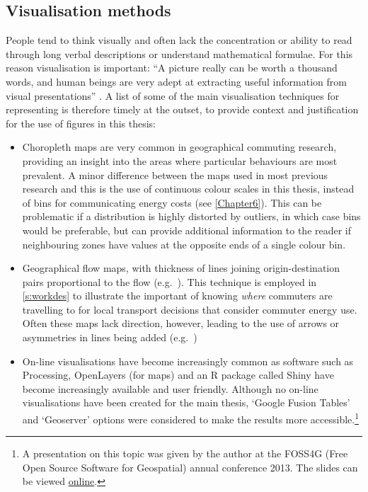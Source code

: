 \subsection{Visualisation methods}
People tend to think visually and often lack the concentration or ability
to read through long verbal descriptions or understand mathematical formulae.
For this reason visualisation is important:
``A picture really can be worth a thousand words, and human beings are very adept
at extracting useful information from visual presentations'' \citep[p.~4]{kabacoff2011r}.
A list of some of the main visualisation techniques for representing
is therefore timely at the outset, to provide context and justification
for the use of figures in this thesis:
\begin{itemize}
 \item Choropleth maps are very common in geographical commuting research,
 providing an insight into the areas where particular behaviours are most
 prevalent. A minor difference between the maps used in most previous
 research and this is the use of continuous colour scales in this thesis,
 instead of bins for communicating energy costs (see \cref{Chapter6}).
 This can be problematic if a distribution is highly
 distorted by outliers, in which case bins would be preferable, but can provide
 additional information to the reader if neighbouring zones have values at the
 opposite ends of a single colour bin.
 \item Geographical flow maps, with thickness of lines joining origin-destination
 pairs proportional to the flow (e.g.~\citealp{Smith2009}).
 This technique is employed in \cref{s:workdes} to illustrate the important of
 knowing \emph{where} commuters are travelling to for local transport decisions
 that consider commuter energy use. Often these maps lack direction, however,
 leading to the use of arrows or asymmetries in lines being added
 (e.g.~\citep{Nielsen2008})
 \item On-line visualisations have become increasingly common as software such
 as Processing, OpenLayers (for maps) and an R package called Shiny have become
 increasingly available and user friendly. Although no on-line visualisations
 have been created for the main thesis, `Google Fusion Tables' and `Geoserver'
 options were considered to make the results more
 accessible.\footnote{A presentation
 on this topic was given by the author at the FOSS4G (Free Open Source
 Software for Geospatial) annual conference 2013.
 The slides can be viewed
 {\color{blue} \href{http://robinlovelace.net/visualisation/open\%20source/conferences/presentation/2013/09/22/foss4g-presentation.html}
 {online}}.
 }
\end{itemize}

